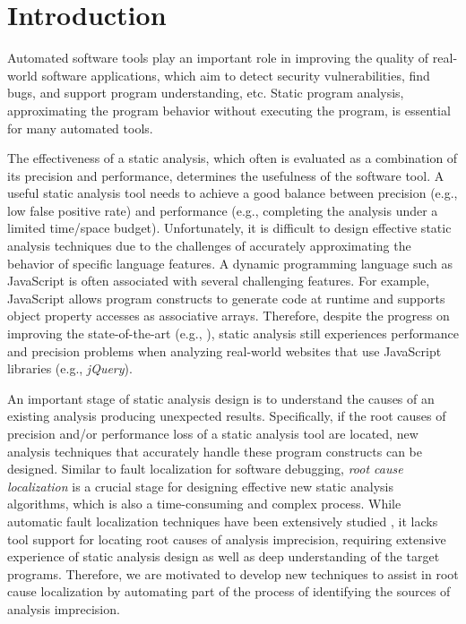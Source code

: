 \section{Introduction}
\label{intro}

Automated software tools play an important role in improving the quality of real-world software applications, which aim to detect security vulnerabilities, find bugs, and support program understanding, etc. Static program analysis, approximating the program behavior without executing the program, is essential for many automated tools. 

The effectiveness of a static analysis, which often is evaluated as a combination of its precision and performance, determines the usefulness of the software tool. A useful static analysis tool needs to achieve a good balance between precision (e.g., low false positive rate) and performance (e.g., completing the analysis under a limited time/space budget). Unfortunately, it is difficult to design effective static analysis techniques due to the challenges of accurately approximating the behavior of specific language features. A dynamic programming language such as JavaScript is often associated with several challenging features. For example, JavaScript allows program constructs to generate code at runtime and supports object property accesses as associative arrays. Therefore, despite the progress on improving the state-of-the-art (e.g., \cite{Sridharan:2012:CTP:2367163.2367191,DBLP:conf/ecoop/WeiR14,Andreasen:2014:DSA:2660193.2660214,DBLP:conf/ecoop/ParkR15}), static analysis still experiences performance and precision problems when analyzing real-world websites that use JavaScript libraries (e.g., {\it jQuery}).

An important stage of static analysis design is to understand the causes of an existing analysis producing unexpected results. Specifically, if the root causes of precision and/or performance loss of a static analysis tool are located, new analysis techniques that accurately handle these program constructs can be designed. Similar to fault localization for software debugging, {\it root cause localization} is a crucial stage for designing effective new static analysis algorithms, which is also a time-consuming and complex process. While automatic fault localization techniques have been extensively studied \cite{Jones:2005:EET:1101908.1101949}, it lacks tool support for locating root causes of analysis imprecision, requiring extensive experience of static analysis design as well as deep understanding of the target programs. Therefore, we are motivated to develop new techniques to assist in root cause localization by automating part of the process of identifying the sources of analysis imprecision.

